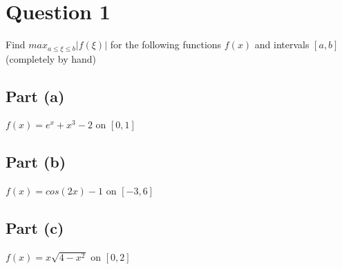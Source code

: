 \section{Question 1}

\begin{question}
    Find $max_{a \leq \xi \leq b}\lvert f(\xi)\rvert$ for the following functions $f(x)$ and intervals $[a,b]$ (completely by hand)
\end{question}

\subsection{Part (a)}

\begin{question}
\begin{center}
    $f(x) = e^x + x^3 −2$ on $[0,1]$
\end{center}
\end{question}

\begin{answer}

\end{answer}

\subsection{Part (b)}

\begin{question}
\begin{center}
    $f(x) = cos(2x) −1$ on $[−3,6]$
\end{center}
\end{question}

\begin{answer}

\end{answer}

\subsection{Part (c)}

\begin{question}
\begin{center}
    $f(x) = x\sqrt{4-x^2}$ on $[0,2]$
\end{center}
\end{question}

\begin{answer}

\end{answer}

